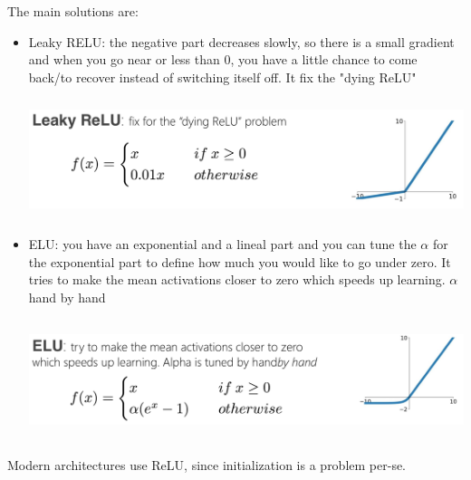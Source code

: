 The main solutions are: 
\begin{itemize}
    \item Leaky RELU: the negative part decreases slowly, so there is a small gradient and when you go near or less than 0, you have a little chance to come back/to recover instead of switching itself off. It fix the "dying ReLU" \\
    \vspace{0.2cm}
    \begin{minipage}{\linewidth}
        \centering
        \includegraphics[width=14cm, height=3.5cm]{images/leaky_relu.png}
    \end{minipage}

    \item ELU: you have an exponential and a lineal part and you can tune the $\alpha$ for the exponential part to define how much you would like to go under zero. It tries to make the mean activations closer to zero which speeds up learning. $\alpha$ hand by hand \\
    \vspace{0.2cm}
    \begin{minipage}{\linewidth}
        \centering
        \includegraphics[width=14cm, height=3.5cm]{images/elu.png}
    \end{minipage}
    
\end{itemize}{}

Modern architectures use ReLU, since initialization is a problem per-se.

